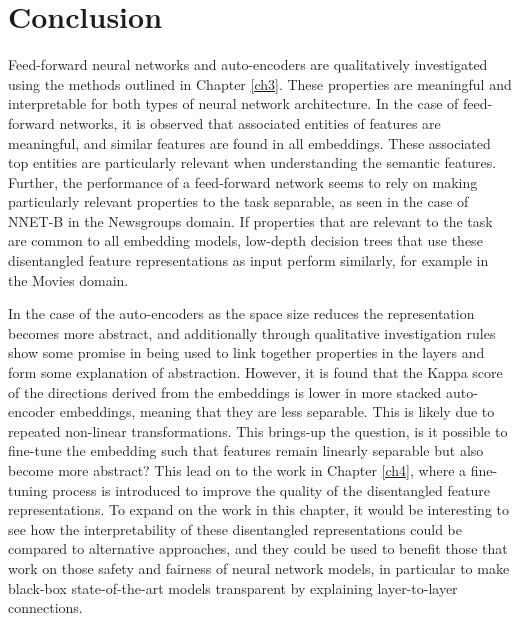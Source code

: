 \section{Conclusion} \label{ch5:conclusion}

Feed-forward neural networks and auto-encoders are qualitatively investigated using the methods outlined in Chapter \ref{ch3}. These properties are meaningful and interpretable for both types of neural network architecture. In the case of feed-forward networks, it is observed that associated entities of features are meaningful, and similar features are found in all embeddings. These associated top entities are particularly relevant when understanding the semantic features. Further, the performance of a feed-forward network seems to rely on making particularly relevant properties to the task separable, as seen in the case of NNET-B in the Newsgroups domain. If properties that are relevant to the task are common to all embedding models, low-depth decision trees that use these disentangled feature representations as input perform similarly, for example in the Movies domain.  

In the case of the auto-encoders as the space size reduces the representation becomes more abstract, and additionally through qualitative investigation rules show some promise in being used to link together properties in the layers and form some explanation of abstraction. However, it is found that the Kappa score of the directions derived from the embeddings is lower in more stacked auto-encoder embeddings, meaning that they are less separable. This is likely due to repeated non-linear transformations. This brings-up the question, is it possible to fine-tune the embedding such that features remain linearly separable but also become more abstract? This lead on to the work  in Chapter \ref{ch4}, where a fine-tuning process is introduced to improve the quality of the disentangled feature representations. To expand on the work in this chapter, it would be interesting to see how the interpretability of these disentangled representations could be compared to alternative approaches, and they could be used to benefit those that work on those  safety and fairness of neural network models, in particular to make black-box state-of-the-art models transparent by  explaining layer-to-layer connections.




